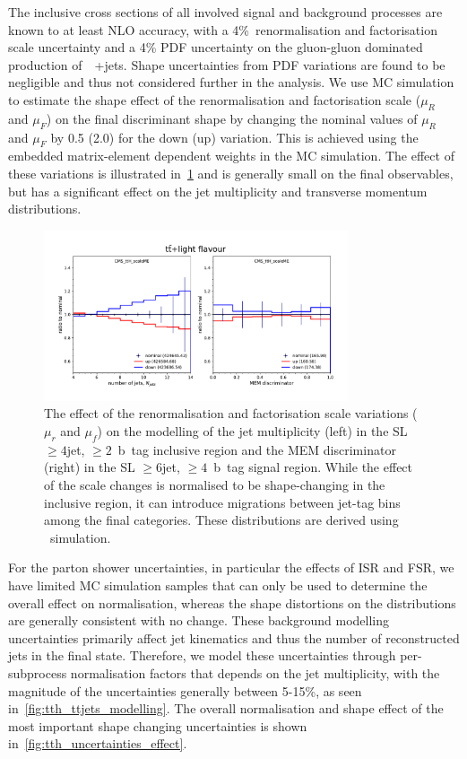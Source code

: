 The inclusive cross sections of all involved signal and background processes are known to at least NLO accuracy, with a 4\%~renormalisation and factorisation scale uncertainty and a 4\% PDF uncertainty on the gluon-gluon dominated production of~\ttbar~+jets. Shape uncertainties from PDF variations are found to be negligible and thus not considered further in the analysis. We use MC simulation to estimate the shape effect of the renormalisation and factorisation scale ($\mu_R$ and $\mu_F$) on the final discriminant shape by changing the nominal values of $\mu_R$ and $\mu_F$ by 0.5 (2.0) for the down (up) variation. This is achieved using the embedded matrix-element dependent weights in the MC simulation. The effect of these variations is illustrated in~\cref{fig:tth_scaleme} and is generally small on the final observables, but has a significant effect on the jet multiplicity and transverse momentum distributions.

\begin{figure}
\begin{centering}
\includegraphics[width=0.8\textwidth]{figures/tth/scaleME_unc.pdf}
\caption[The effect of $\mu_r$ and $\mu_f$ variations.]{The effect of the renormalisation and factorisation scale variations ($\mu_r$ and $\mu_f$) on the modelling of the jet multiplicity (left) in the SL $\geq4$jet, $\geq2$~b~tag inclusive region and the MEM discriminator (right) in the SL $\geq6$jet, $\geq4$~b~tag signal region. While the effect of the scale changes is normalised to be shape-changing in the inclusive region, it can introduce migrations between jet-tag bins among the final categories. These distributions are derived using \ttlf~simulation.}
\label{fig:tth_scaleme}
\end{centering}
\end{figure}

For the parton shower uncertainties, in particular the effects of ISR and FSR, we have limited MC simulation samples that can only be used to determine the overall effect on normalisation, whereas the shape distortions on the distributions are generally consistent with no change. These background modelling uncertainties primarily affect jet kinematics and thus the number of reconstructed jets in the final state. Therefore, we model these uncertainties through per-subprocess normalisation factors that depends on the jet multiplicity, with the magnitude of the uncertainties generally between 5-15\%, as seen in~\cref{fig:tth_ttjets_modelling}. The overall normalisation and shape effect of the most important shape changing uncertainties is shown in~\cref{fig:tth_uncertainties_effect}.

